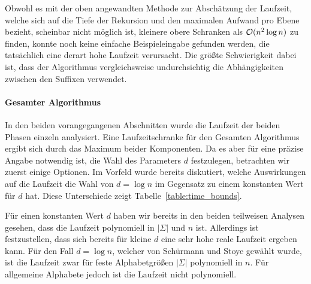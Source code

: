 Obwohl es mit der oben angewandten Methode zur Abschätzung der Laufzeit, welche sich auf die Tiefe der Rekursion und den maximalen Aufwand pro Ebene bezieht, scheinbar nicht möglich ist, kleinere obere Schranken als \(\mathcal{O}(n^2 \log n)\) zu finden, konnte noch keine einfache Beispieleingabe gefunden werden, die tatsächlich eine derart hohe Laufzeit verursacht. Die größte Schwierigkeit dabei ist, dass der Algorithmus vergleichsweise undurchsichtig die Abhängigkeiten zwischen den Suffixen verwendet.
\paragraph*{Gesamter Algorithmus}
In den beiden vorangegangenen Abschnitten wurde die Laufzeit der beiden Phasen einzeln analysiert. Eine Laufzeitschranke für den Gesamten Algorithmus ergibt sich durch das Maximum beider Komponenten. Da es aber für eine präzise Angabe notwendig ist, die Wahl des Parameters \(d\) festzulegen, betrachten wir zuerst einige Optionen. Im Vorfeld wurde bereits diskutiert, welche Auswirkungen auf die Laufzeit die Wahl von \(d = \log n\) im Gegensatz zu einem konstanten Wert für \(d\) hat. Diese Unterschiede zeigt Tabelle~\ref{table:time_bounds}.
\begin{table}[h]
	\centering
    \vspace{1ex}
    \caption{Laufzeitschranken für \bpr in Abhängigkeit von \(d\)}
    \label{table:time_bounds}
\end{table}
Für einen konstanten Wert \(d\) haben wir bereits in den beiden teilweisen Analysen gesehen, dass die Laufzeit polynomiell in \(|\Sigma|\) und \(n\) ist. Allerdings ist festzustellen, dass sich bereits für kleine \(d\) eine sehr hohe reale Laufzeit ergeben kann. Für den Fall \(d = \log n\), welcher von Schürmann und Stoye gewählt wurde, ist die Laufzeit zwar für feste Alphabetgrößen \(|\Sigma|\) polynomiell in \(n\). Für allgemeine Alphabete jedoch ist die Laufzeit nicht polynomiell.\par
